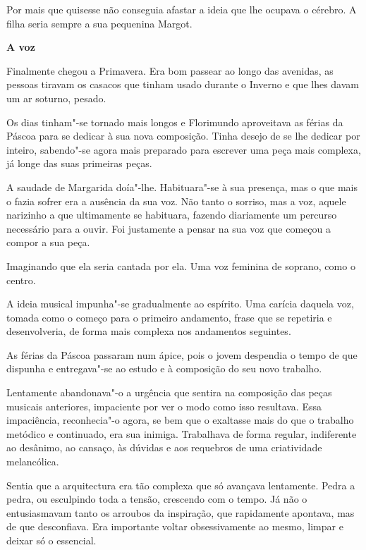 Por mais que quisesse não conseguia afastar a ideia que lhe ocupava o
cérebro. A filha seria sempre a sua pequenina Margot.

\vspace*{1.8cm}
\noindent{}\textbf{A voz}

\bigskip

Finalmente chegou a Primavera. Era bom passear ao longo das avenidas, as
pessoas tiravam os casacos que tinham usado durante o Inverno e que lhes
davam um ar soturno, pesado.

Os dias tinham"-se tornado mais longos e Florimundo aproveitava as férias
da Páscoa para se dedicar à sua nova composição. Tinha desejo de se lhe
dedicar por inteiro, sabendo"-se agora mais preparado para escrever uma
peça mais complexa, já longe das suas primeiras peças.

A saudade de Margarida doía"-lhe. Habituara"-se à sua presença, mas o que
mais o fazia sofrer era a ausência da sua voz. Não tanto o sorriso, mas
a voz, aquele narizinho a que ultimamente se habituara, fazendo
diariamente um percurso necessário para a ouvir. Foi justamente a pensar
na sua voz que começou a compor a sua peça.

Imaginando que ela seria cantada por ela. Uma voz feminina de soprano,
como o centro.

A ideia musical impunha"-se gradualmente ao espírito. Uma carícia daquela
voz, tomada como o começo para o primeiro andamento, frase que se
repetiria e desenvolveria, de forma mais complexa nos andamentos
seguintes.

As férias da Páscoa passaram num ápice, pois o jovem despendia o tempo
de que dispunha e entregava"-se ao estudo e à composição do seu novo
trabalho.

Lentamente abandonava"-o a urgência que sentira na composição das peças
musicais anteriores, impaciente por ver o modo como isso resultava. Essa
impaciência, reconhecia"-o agora, se bem que o exaltasse mais do que o
trabalho metódico e continuado, era sua inimiga. Trabalhava de forma
regular, indiferente ao desânimo, ao cansaço, às dúvidas e aos requebros
de uma criatividade melancólica.

Sentia que a arquitectura era tão complexa que só avançava lentamente.
Pedra a pedra, ou esculpindo toda a tensão, crescendo com o tempo. Já
não o entusiasmavam tanto os arroubos da inspiração, que rapidamente
apontava, mas de que desconfiava. Era importante voltar obsessivamente
ao mesmo, limpar e deixar só o essencial.

